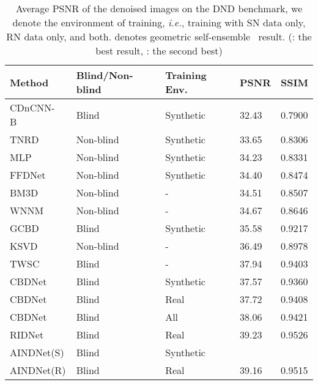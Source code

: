 \documentclass[10pt,twocolumn,letterpaper]{article}
\begin{document}
\begin{table}[t]
	\centering
	\caption{Average PSNR of the denoised images on the DND benchmark, we denote the environment of training, {\em i.e.}, training with SN data only, RN data only, and both.  denotes geometric self-ensemble~\cite{timofte2016seven} result. (\color{red}{red}: \color{black} the best result, \color{blue}{blue}: \color{black} the second best)}
	\label{talbe:DND}
	\begin{adjustbox}{width=0.94\linewidth}
		\begin{tabular}{lllll}
			\toprule			
			Method & Blind/Non-blind   & Training Env.    & PSNR & SSIM  \\
			\midrule
			CDnCNN-B~\cite{zhang2017beyond}         & Blind 	 & Synthetic  & 32.43      & 0.7900      \\
			TNRD~\cite{chen2016trainable}         	 & Non-blind & Synthetic  & 33.65      & 0.8306      \\
			MLP~\cite{burger2012image}         	 & Non-blind & Synthetic  & 34.23  	  & 0.8331      \\
			FFDNet~\cite{zhang2018ffdnet}         	 & Non-blind & Synthetic  & 34.40  	  & 0.8474      \\
			BM3D~\cite{dabov2007color}         	 & Non-blind & -  & 34.51  	  & 0.8507      \\
			WNNM~\cite{gu2014weighted}         	 & Non-blind & -  & 34.67  	  & 0.8646      \\
			GCBD~\cite{chen2018image}         	 & Blind 	 & Synthetic  & 35.58  	  & 0.9217      \\
			KSVD~\cite{aharon2006k}         	 & Non-blind & -  & 36.49  	  & 0.8978      \\
			TWSC~\cite{xu2018trilateral}         	 & Blind 	 & -  & 37.94 	  & 0.9403      \\
			CBDNet~\cite{guo2019toward}    	 & Blind 	 & Synthetic  & 37.57  	  & 0.9360      \\
			CBDNet~\cite{guo2019toward}     & Blind 	 & Real  & 37.72  	  & 0.9408      \\
			CBDNet~\cite{guo2019toward}    	 & Blind 	 & All  & 38.06  	  & 0.9421      \\				
			RIDNet~\cite{Anwar_2019_ICCV}					& Blind		& Real	& 39.23 & 0.9526 \\		
			\midrule
			AINDNet(S) 	    	& Blind 	 & Synthetic  & \color{blue}{39.53}  	  & \color{blue}{0.9561}      \\	
			AINDNet(R) 		& Blind 	 & Real  & 39.16  	  & 0.9515		\\

\end{tabular}
\end{adjustbox}
\end{table}
\end{document}
